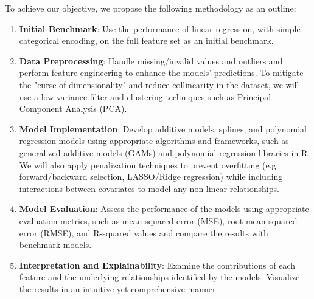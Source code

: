 \documentclass[aoas]{imsart}
\numberwithin{equation}{section}
\theoremstyle{plain}
\theoremstyle{remark}
\begin{document}
To achieve our objective, we propose the following methodology as an
outline:

\begin{enumerate}
\item
  \textbf{Initial Benchmark}: Use the performance of linear regression, with simple categorical encoding, on the full
  feature set as an initial benchmark.
  \vspace{0.2cm}
\item
  \textbf{Data Preprocessing}: Handle missing/invalid values and outliers and perform feature engineering to enhance
  the models' predictions. To mitigate the "curse of dimensionality" and reduce collinearity in the dataset, we
   will use a low variance filter and clustering techniques such as Principal Component Analysis (PCA).
   \vspace{0.2cm}
\item
  \textbf{Model Implementation}: Develop additive models, splines, and
  polynomial regression models using appropriate algorithms and
  frameworks, such as generalized additive models (GAMs) and polynomial
  regression libraries in R. We will also apply penalization techniques
  to prevent overfitting (e.g. forward/backward selection, LASSO/Ridge regression)
  while including interactions between covariates to model any non-linear relationships.
  \vspace{0.2cm}
\item
  \textbf{Model Evaluation}: Assess the performance of the models using
  appropriate evaluation metrics, such as mean squared error (MSE), root
  mean squared error (RMSE), and R-squared values and compare the
  results with benchmark models.
  \vspace{0.2cm}
\item
  \textbf{Interpretation and Explainability}: Examine the contributions of each
  feature and the underlying relationships identified by the models. Visualize the results in an intuitive yet
  comprehensive manner.
\end{enumerate}



\end{document}
